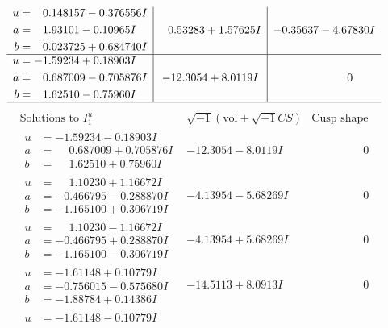 \documentclass[1p]{elsarticle_modified}
\theoremstyle{definition}
\newcommand{\I}{\sqrt{-1}}
\begin{document}
$$\begin{array}{c|c|c}
\begin{aligned}
u &= \phantom{-}0.148157 - 0.376556 I \\
a &= \phantom{-}1.93101 - 0.10965 I \\
b &= \phantom{-}0.023725 + 0.684740 I\end{aligned}
 & \phantom{-}0.53283 + 1.57625 I & -0.35637 - 4.67830 I \\ \hline\begin{aligned}
u &= -1.59234 + 0.18903 I \\
a &= \phantom{-}0.687009 - 0.705876 I \\
b &= \phantom{-}1.62510 - 0.75960 I\end{aligned}
 & -12.3054 + 8.0119 I & \phantom{-0.000000 } 0\\
 \hline 
 \end{array}$$\newpage$$\begin{array}{c|c|c}  
\text{Solutions to }I^u_{1}& \I (\text{vol} + \sqrt{-1}CS) & \text{Cusp shape}\\
 \hline 
\begin{aligned}
u &= -1.59234 - 0.18903 I \\
a &= \phantom{-}0.687009 + 0.705876 I \\
b &= \phantom{-}1.62510 + 0.75960 I\end{aligned}
 & -12.3054 - 8.0119 I & \phantom{-0.000000 } 0 \\ \hline\begin{aligned}
u &= \phantom{-}1.10230 + 1.16672 I \\
a &= -0.466795 - 0.288870 I \\
b &= -1.165100 + 0.306719 I\end{aligned}
 & -4.13954 - 5.68269 I & \phantom{-0.000000 } 0 \\ \hline\begin{aligned}
u &= \phantom{-}1.10230 - 1.16672 I \\
a &= -0.466795 + 0.288870 I \\
b &= -1.165100 - 0.306719 I\end{aligned}
 & -4.13954 + 5.68269 I & \phantom{-0.000000 } 0 \\ \hline\begin{aligned}
u &= -1.61148 + 0.10779 I \\
a &= -0.756015 - 0.575680 I \\
b &= -1.88784 + 0.14386 I\end{aligned}
 & -14.5113 + 8.0913 I & \phantom{-0.000000 } 0 \\ \hline\begin{aligned}
u &= -1.61148 - 0.10779 I \\

\end{aligned}
\end{array}$$
\end{document}
